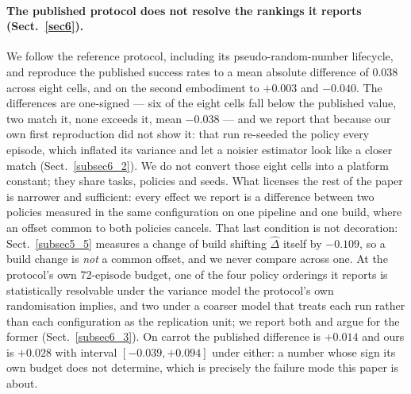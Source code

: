 \documentclass[pdflatex,iicol,sn-apa]{sn-jnl}
\theoremstyle{remark}
\begin{document}
\paragraph{The published protocol does not resolve the rankings it reports (Sect.~\ref{sec6}).}
We follow the reference protocol, including its pseudo-random-number lifecycle, and reproduce the
published success rates to a mean absolute difference of 0.038 across eight cells, and on the second
embodiment to $+0.003$ and $-0.040$. The differences are one-signed --- six of the eight cells fall
below the published value, two match it, none exceeds it, mean $-0.038$ --- and we report that
because our own first reproduction did not show it: that run re-seeded the policy every episode,
which inflated its variance and let a noisier estimator look like a closer match
(Sect.~\ref{subsec6_2}). We do not convert those eight cells into a platform constant; they share
tasks, policies and seeds. What licenses the rest of the paper is narrower and sufficient: every
effect we report is a difference between two policies measured in the same configuration on one
pipeline and one build, where an offset common to both policies cancels. That last condition is not
decoration: Sect.~\ref{subsec5_5} measures a change of build shifting $\hat\Delta$ itself by
$-0.109$, so a build change is \emph{not} a common offset, and we never compare across one. At the
protocol's own 72-episode budget, one of the four policy orderings it reports is statistically
resolvable under the variance model the protocol's own randomisation implies, and two under a
coarser model that treats each run rather than each configuration as the replication unit; we report
both and argue for the former (Sect.~\ref{subsec6_3}). On carrot the published difference is $+0.014$
and ours is $+0.028$ with interval $[-0.039, +0.094]$ under either: a number whose sign its own
budget does not determine, which is precisely the failure mode this paper is about.
\end{document}
